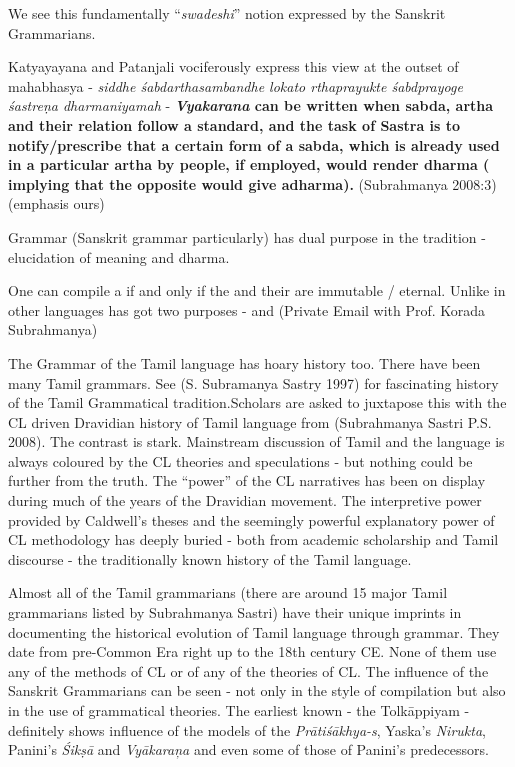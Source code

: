 We see this fundamentally “\textit{swadeshi}” notion expressed by the Sanskrit Grammarians.

\begin{myquote}
Katyayayana and Patanjali vociferously express this view at the outset of mahabhasya - \textit{siddhe śabdarthasambandhe lokato rthaprayukte śabdprayoge śastreṇa dharmaniyamah} - \textbf{\textit{Vyakarana} can be written when sabda, artha and their relation follow a standard, and the task of Sastra is to notify/prescribe that a certain form of a sabda, which is already used in a particular artha by people, if employed, would render dharma ( implying that the opposite would give adharma).} (Subrahmanya 2008:3) (emphasis ours)
\end{myquote}

Grammar (Sanskrit grammar particularly) has dual purpose in the tradition - elucidation of meaning and dharma.

\begin{myquote}
One can compile a  if and only if the  and their  are immutable / eternal. Unlike in other languages  has got two purposes -  and  (Private Email with Prof. Korada Subrahmanya)
\end{myquote}

The Grammar of the Tamil language has hoary history too. There have been many Tamil grammars. See (S. Subramanya Sastry 1997) for fascinating history of the Tamil Grammatical tradition.Scholars are asked to juxtapose this with the CL driven Dravidian history of Tamil language from (Subrahmanya Sastri P.S. 2008). The contrast is stark. Mainstream discussion of Tamil and the language is always coloured by the CL theories and speculations - but nothing could be further from the truth. The “power” of the CL narratives has been on display during much of the years of the Dravidian movement. The interpretive power provided by Caldwell’s theses and the seemingly powerful explanatory power of CL methodology has deeply buried - both from academic scholarship and Tamil discourse - the traditionally known history of the Tamil language.

Almost all of the Tamil grammarians (there are around 15 major Tamil grammarians listed by Subrahmanya Sastri) have their unique imprints in documenting the historical evolution of Tamil language through grammar. They date from pre-Common Era right up to the 18th century CE. None of them use any of the methods of CL or of any of the theories of CL. The influence of the Sanskrit Grammarians can be seen - not only in the style of compilation but also in the use of grammatical theories. The earliest known - the Tolkāppiyam - definitely shows influence of the models of the \textit{Prātiśākhya-s}, Yaska’s \textit{Nirukta}, Panini’s \textit{Śikṣā} and \textit{Vyākaraņa} and even some of those of Panini’s predecessors.

